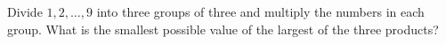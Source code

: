 Divide $1,2,\dots,9$ into three groups of three and multiply the numbers in each group. What is the smallest possible value of the largest of the three products?
